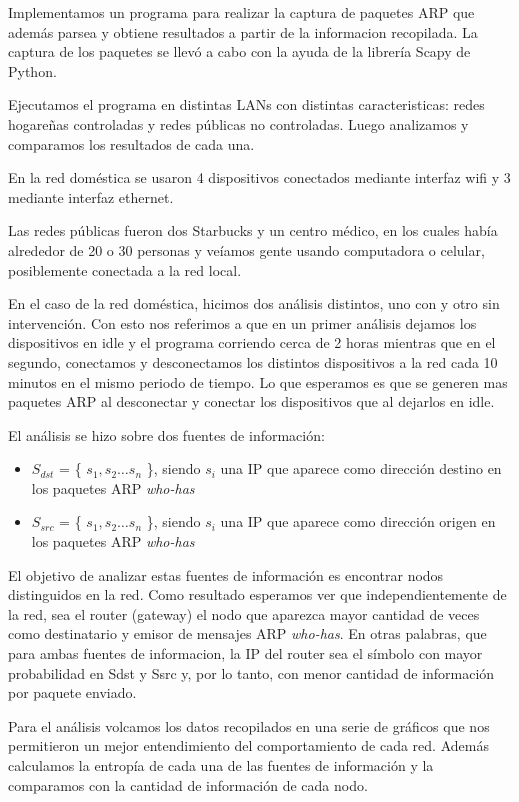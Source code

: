 Implementamos un programa para realizar la captura de paquetes ARP que además parsea y obtiene resultados a partir de la informacion recopilada. La captura de los paquetes se llevó a cabo con la ayuda de la librería Scapy de Python.

Ejecutamos el programa en distintas LANs con distintas caracteristicas: redes hogare\~nas controladas y redes públicas no controladas. Luego analizamos y comparamos los resultados de cada una.\

En la red doméstica se usaron 4 dispositivos conectados mediante interfaz wifi y 3 mediante interfaz ethernet.

Las redes públicas fueron dos Starbucks y un centro médico, en los cuales había alrededor de 20 o 30 personas y veíamos gente usando computadora o celular, posiblemente conectada a la red local.

En el caso de la red doméstica, hicimos dos análisis distintos, uno con y otro sin intervención. Con esto nos referimos a que en un primer análisis dejamos los dispositivos en idle y el programa corriendo cerca de 2 horas mientras
que en el segundo, conectamos y desconectamos los distintos dispositivos a la red cada 10 minutos en el mismo periodo de tiempo. Lo que esperamos es que se generen mas paquetes ARP al desconectar y conectar los dispositivos que al dejarlos en idle.

El análisis se hizo sobre dos fuentes de información:

\begin{itemize}
\item $S_{dst}$ = \{ $s_{1},s_{2} \ldots s_{n} $ \}, siendo $s_{i}$ una IP que aparece como dirección destino en los paquetes
ARP \emph{who-has}
\item $S_{src}$ = \{ $s_{1},s_{2} \ldots s_{n} $ \}, siendo $s_{i}$ una IP que aparece como dirección origen en los paquetes
ARP \emph{who-has}
\end{itemize}

El objetivo de analizar estas fuentes de información es encontrar nodos distinguidos en la red. Como resultado esperamos ver que independientemente de la red, sea el router (gateway) el nodo que aparezca mayor cantidad de veces como destinatario y 
emisor de mensajes ARP \emph{who-has}.
En otras palabras, que para ambas fuentes de informacion, la IP del router sea el símbolo con mayor probabilidad en Sdst y Ssrc y, por lo tanto, con menor cantidad de información por paquete enviado.

Para el análisis volcamos los datos recopilados en una serie de gráficos que nos permitieron un mejor entendimiento del comportamiento de cada red. Además calculamos la entropía de cada una de las fuentes de información y la comparamos con la cantidad de información de cada nodo.
